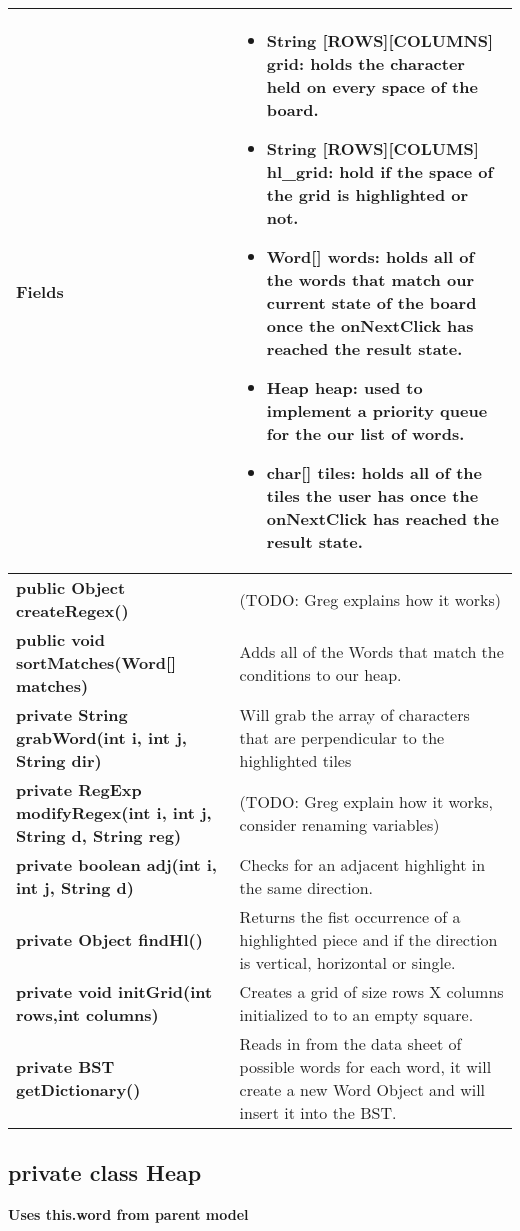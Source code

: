 \documentclass[11pt]{article}
\begin{document}
\begin{tabular}{|p{}|p{}|}
\textbf{Fields} & 
\begin{itemize}
	\item String  [ROWS][COLUMNS] grid: holds the character held on every space of the board. 
	\item String [ROWS][COLUMS] hl\_grid: hold if the space of the grid is highlighted or not.
	\item Word[] words: holds all of the words that match our current state of the board once the onNextClick has reached the result state.
	\item Heap heap: used to implement a priority queue for the our list of words.
	\item char[] tiles:  holds all of the tiles the user has once the onNextClick has reached the result state.
\end{itemize} \\
\hline
\textbf{public Object createRegex()} & (TODO: Greg explains how it works)\\
%
\hline
\textbf{public void sortMatches(Word[] matches)} & Adds all of the Words that match the conditions to our heap.\\
\hline
\textbf{private String grabWord(int i, int j, String dir)} & Will grab the array of characters that are perpendicular to the highlighted tiles \\
\hline
\textbf{private RegExp modifyRegex(int i, int j, String d, String reg)} &
(TODO: Greg explain how it works,  consider renaming variables)\\
\hline
\textbf{private boolean adj(int i, int j, String d)} & Checks for an adjacent highlight in the same direction. \\
\hline
\textbf{private Object findHl()} & Returns the fist occurrence of a highlighted piece and if the direction is vertical, horizontal or single.\\
\hline
\textbf{private void initGrid(int rows,int columns)} & Creates a grid of size rows X columns initialized to to an empty square. \\
\hline
\textbf{private BST getDictionary()} & Reads in from the data sheet of possible words for each word, it will create a new Word Object and will insert it into the BST.\\
\hline
\end{tabular}

\subsection{private class Heap}
\textbf{Uses this.word from parent model}
\end{document}
